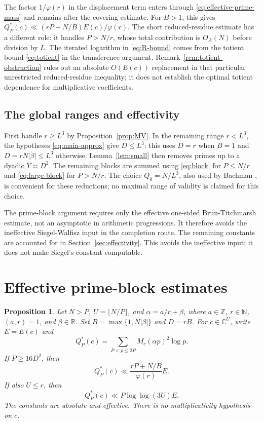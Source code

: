 \documentclass[11pt]{amsart}
\numberwithin{equation}{section}
\numberwithin{figure}{section}
\newtheorem{proposition}{Proposition}[section]
\theoremstyle{definition}
\newcommand{\Z}{\mathbb{Z}}
\newcommand{\R}{\mathbb{R}}
\newcommand{\C}{\mathbb{C}}
\newcommand{\N}{\mathbb{N}}
\begin{document}
The factor $1/\varphi(r)$ in the displacement term enters through
\eqref{eq:effective-prime-mass} and remains after the covering estimate.
For $B>1$, this gives
$Q_P^*(c)\ll(rP+N/B)E(c)/\varphi(r)$.
The short reduced-residue estimate has a different role: it handles
$P>N/r$, whose total contribution is $O_A(N)$ before division by $L$.
The iterated logarithm in \eqref{eq:R-bound} comes from the totient
bound \eqref{eq:totient} in the transference argument.
Remark~\ref{rem:totient-obstruction} rules out an absolute $O(E(c))$
replacement in that particular unrestricted reduced-residue inequality;
it does not establish the optimal totient dependence for multiplicative
coefficients.

\subsection{The global ranges and effectivity}
First handle $r\ge L^3$ by Proposition~\ref{prop:MV}. In the remaining
range $r<L^3$, the hypotheses \eqref{eq:main-approx} give $D\le L^3$:
this uses $D=r$ when $B=1$ and $D=rN|\beta|\le L^3$ otherwise.
Lemma~\ref{lem:small} then removes primes up to a dyadic
$Y\asymp D^2$. The remaining blocks are summed using
\eqref{eq:block} for $P\le N/r$ and \eqref{eq:large-block} for $P>N/r$.
The choice $Q_0=N/L^3$, also used by Bachman
\cite[Theorems~1 and~4]{Bachman}, is convenient for these reductions;
no maximal range of validity is claimed for this choice.

The prime-block argument requires only the effective one-sided
Brun-Titchmarsh estimate, not an asymptotic in arithmetic progressions.
It therefore avoids the ineffective Siegel-Walfisz input in the
completion route. The remaining constants are accounted for in
Section~\ref{sec:effectivity}. This avoids the ineffective input; it
does not make Siegel's constant computable.

\section{Effective prime-block estimates}\label{sec:effective-sieve}

\begin{proposition}\label{prop:effective-maximal-prime}
Let $N>P$, $U=\lfloor N/P\rfloor$, and
$\alpha=a/r+\beta$, where $a\in\Z$, $r\in\N$, $(a,r)=1$, and
$\beta\in\R$. Set $B=\max\{1,N|\beta|\}$ and $D=rB$.
For $c\in\C^U$, write $E=E(c)$ and
\begin{equation}\label{eq:Qstar-def}
 Q_P^*(c)=\sum_{P<p\le2P}M_c(\alpha p)^2\log p.
\end{equation}
If $P\ge16D^2$, then
\begin{equation}\label{eq:effective-prime-general}
 Q_P^*(c)\ll\frac{rP+N/B}{\varphi(r)}E.
\end{equation}
If also $U\le r$, then
\begin{equation}\label{eq:effective-prime-short}
 Q_P^*(c)\ll P\log\log(3U)E.
\end{equation}
The constants are absolute and effective. There is no multiplicativity
hypothesis on $c$.
\end{proposition}
\end{document}
